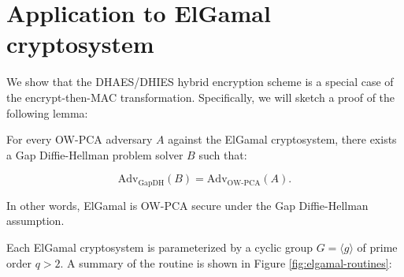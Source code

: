 \documentclass[runningheads]{llncs}
\begin{document}
\section{Application to ElGamal cryptosystem}\label{sec:application-to-elgamal}
We show that the DHAES/DHIES hybrid encryption scheme is a special case of the encrypt-then-MAC transformation. Specifically, we will sketch a proof of the following lemma:

\begin{lemma}\label{lemma:elgamal-is-ow-pca}
    For every OW-PCA adversary $A$ against the ElGamal cryptosystem, there exists a Gap Diffie-Hellman problem solver $B$ such that:

    \begin{equation*}
        \text{Adv}_\text{GapDH}(B) = \text{Adv}_\text{OW-PCA}(A).
    \end{equation*}

    In other words, ElGamal is OW-PCA secure under the Gap Diffie-Hellman assumption.
\end{lemma}

Each ElGamal cryptosystem \cite{DBLP:journals/tit/Elgamal85} is parameterized by a cyclic group $G = \langle g \rangle$ of prime order $q > 2$. A summary of the routine is shown in Figure \ref{fig:elgamal-routines}:
\end{document}
